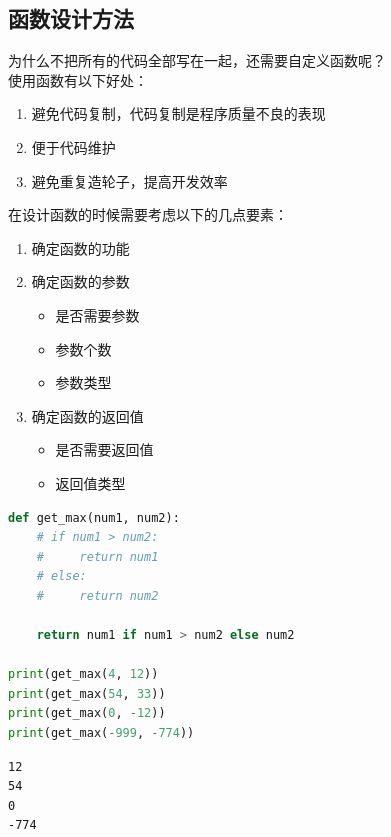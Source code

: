 \vspace{0.5cm}

\subsection{函数设计方法}

为什么不把所有的代码全部写在一起，还需要自定义函数呢？\\

使用函数有以下好处：

\begin{enumerate}
	\item 避免代码复制，代码复制是程序质量不良的表现
	\item 便于代码维护
	\item 避免重复造轮子，提高开发效率
\end{enumerate}

在设计函数的时候需要考虑以下的几点要素：

\begin{enumerate}
	\item 确定函数的功能

	\item 确定函数的参数
	      \begin{itemize}
		      \item 是否需要参数
		      \item 参数个数
		      \item 参数类型
	      \end{itemize}

	\item 确定函数的返回值
	      \begin{itemize}
		      \item 是否需要返回值
		      \item 返回值类型
	      \end{itemize}
\end{enumerate}


\begin{lstlisting}[language=Python]
def get_max(num1, num2):
    # if num1 > num2:
    #     return num1
    # else:
    #     return num2

    return num1 if num1 > num2 else num2

print(get_max(4, 12))
print(get_max(54, 33))
print(get_max(0, -12))
print(get_max(-999, -774))
\end{lstlisting}

\begin{tcolorbox}
	\begin{verbatim}
12
54
0
-774
\end{verbatim}
\end{tcolorbox}

